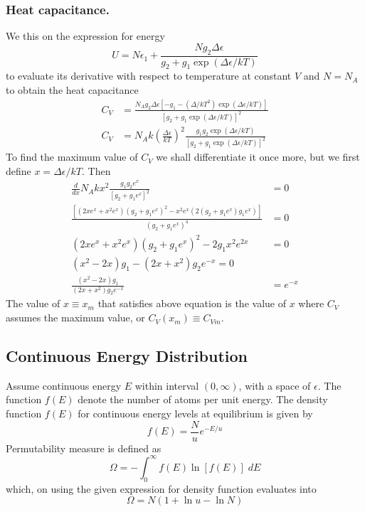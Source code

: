 \documentclass[../../../Main.tex]{subfiles}
\begin{document}
\subsubsection*{Heat capacitance.} We this on the expression for energy 
\begin{equation*}
    U=N\epsilon_1+\frac{Ng_2\Delta\epsilon}{g_2+g_1\exp(\Delta\epsilon/kT)}
\end{equation*}
to evaluate its derivative with respect to temperature at constant $V$ and $N=N_A$ to obtain the heat capacitance
\begin{align*}
    C_V&=\frac{N_Ag_2\Delta\epsilon\left[-g_1-(\Delta/kT^2)\exp (\Delta \epsilon/kT) \right]}{\left[g_2+g_1\exp(\Delta\epsilon/kT)\right]^2}\\
    C_V&=N_Ak\left(\frac{\Delta\epsilon}{kT}\right)^2\frac{g_1g_2\exp(\Delta\epsilon/kT)}{\left[g_2+g_1\exp(\Delta\epsilon/kT)\right]^2}
\end{align*}
To find the maximum value of $C_V$ we shall differentiate it once more, but we first define $x=\Delta\epsilon/kT$. Then 
\begin{align*}
    \frac{d}{dx}N_Akx^2\frac{g_1g_2e^x}{\left[g_2+g_1e^x\right]^2}&=0\\
    \frac{\left[(2xe^x+x^2e^x)(g_2+g_1e^x)^2-x^2e^x(2(g_2+g_1e^x)g_1e^x)\right]}{(g_2+g_1e^x)^4}&=0\\
    (2xe^x+x^2e^x)(g_2+g_1e^x)^2-2g_1x^2e^{2x}&=0\\
    (x^2-2x)g_1-(2x+x^2)g_2e^{-x}=0\\
   \frac{(x^2-2x)g_1}{(2x+x^2)g_2e^{-x}} &=e^{-x}
\end{align*}
The value of $x\equiv x_m$ that satisfies above equation is the value of $x$ where $C_V$ assumes the maximum value, or $C_V(x_m)\equiv C_{Vm}$.

\subsection*{Continuous Energy Distribution}
Assume continuous energy $E$ within interval $(0,\infty)$, with a space of $\epsilon$. The function $f(E)$ denote the number of atoms per unit energy. The density function $f(E) $ for continuous energy levels at equilibrium is given by
\begin{equation*}
    f(E)=\frac{N}{u}e^{-E/u}
\end{equation*}
Permutability measure is defined as 
\begin{equation*}
    \Omega=-\int_{0}^{\infty}f(E)\ln\left[f(E)\right]\;dE
\end{equation*}
which, on using the given expression for density function evaluates into 
\begin{equation*}
    \Omega=N(1+\ln u-\ln N)
\end{equation*}
\end{document}
